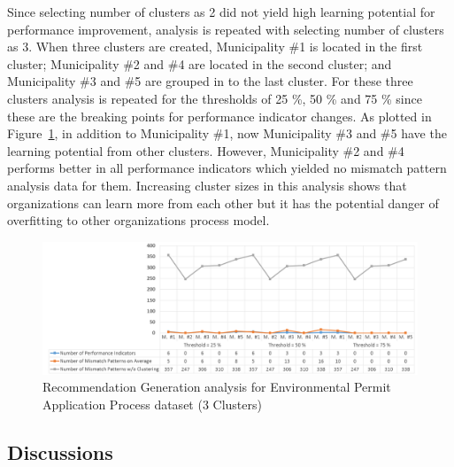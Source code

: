 Since selecting number of clusters as 2 did not yield high learning potential for performance improvement, analysis is repeated with selecting number of clusters as 3. When three clusters are created, Municipality \#1 is located in the first cluster; Municipality \#2 and \#4 are located in the second cluster; and Municipality \#3 and \#5 are grouped in to the last cluster. For these three clusters analysis is repeated for the thresholds of 25 \%, 50 \% and 75 \% since these are the breaking points for performance indicator changes. As plotted in Figure~\ref{fig:coselog-wabo-recommendation-generation-analysis-k3}, in addition to Municipality \#1, now Municipality \#3 and \#5 have the learning potential from other clusters. However, Municipality \#2 and \#4 performs better in all performance indicators which yielded no mismatch pattern analysis data for them. Increasing cluster sizes in this analysis shows that organizations can learn more from each other but it has the potential danger of overfitting to other organizations process model. 
\begin{figure}
	\centering
	\includegraphics[width=\textwidth]{5_results_discussions/coselog-wabo/recommendation-generation-analysis-k3}
	\caption{Recommendation Generation analysis for Environmental Permit Application Process dataset (3 Clusters)}
  \label{fig:coselog-wabo-recommendation-generation-analysis-k3}
\end{figure}

\subsection{Discussions}
\label{sec:coselog-discussions}

